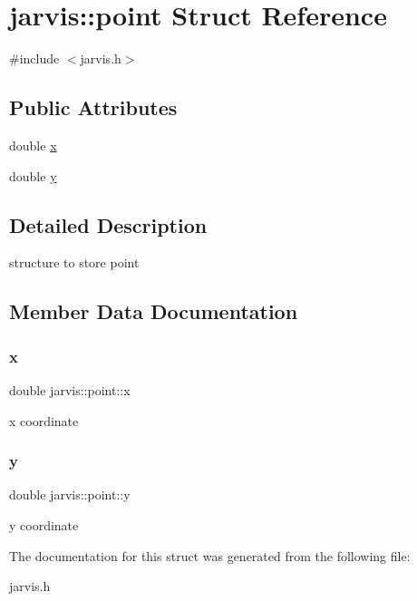 \hypertarget{structjarvis_1_1point}{}\section{jarvis\+:\+:point Struct Reference}
\label{structjarvis_1_1point}


{\ttfamily \#include $<$jarvis.\+h$>$}

\subsection*{Public Attributes}
\begin{DoxyCompactItemize}
\item 
double \hyperlink{structjarvis_1_1point_aa6322386b528b763052690c0be684f11}{x}
\item 
double \hyperlink{structjarvis_1_1point_ac184f1a688eee86cc9989bb74b130f5f}{y}
\end{DoxyCompactItemize}


\subsection{Detailed Description}
structure to store point 

\subsection{Member Data Documentation}
\mbox{\label{structjarvis_1_1point_aa6322386b528b763052690c0be684f11}} 
\subsubsection{\texorpdfstring{x}{x}}
{\footnotesize\ttfamily double jarvis\+::point\+::x}

x coordinate \mbox{\label{structjarvis_1_1point_ac184f1a688eee86cc9989bb74b130f5f}} 
\subsubsection{\texorpdfstring{y}{y}}
{\footnotesize\ttfamily double jarvis\+::point\+::y}

y coordinate 

The documentation for this struct was generated from the following file\+:\begin{DoxyCompactItemize}
\item 
jarvis.\+h\end{DoxyCompactItemize}
